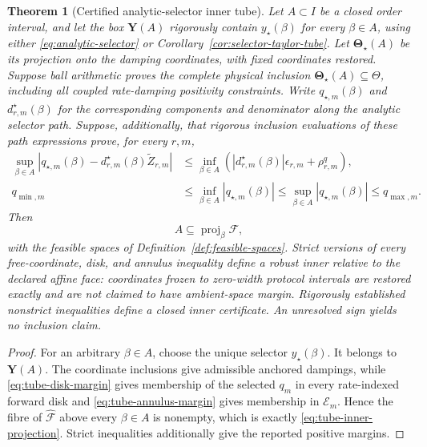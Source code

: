 \documentclass[11pt]{article}
\newtheorem{theorem}{Theorem}
\theoremstyle{definition}
\theoremstyle{remark}
\newcommand{\Eset}{\mathcal E}
\newcommand{\proj}{\operatorname{proj}}
\begin{document}
\begin{theorem}[Certified analytic-selector inner tube]
\label{thm:selector-tube}
Let \(A\subset I\) be a closed order interval, and let the box
\(\boldsymbol Y(A)\) rigorously contain \(y_\star(\beta)\) for every
\(\beta\in A\), using either \eqref{eq:analytic-selector} or
Corollary~\ref{cor:selector-taylor-tube}.  Let
\(\boldsymbol\Theta_\star(A)\) be its projection onto the damping coordinates,
with fixed coordinates restored.  Suppose ball arithmetic proves the complete
physical inclusion
\(\boldsymbol\Theta_\star(A)\subseteq\Theta\), including all coupled
rate-damping positivity constraints.  Write
\(q_{\star,m}(\beta)\) and \(d^\star_{r,m}(\beta)\) for the corresponding
components and denominator along the analytic selector path.  Suppose,
additionally, that rigorous inclusion evaluations of these path expressions
prove, for every \(r,m\),
\begin{align}
 \sup_{\beta\in A}
 |q_{\star,m}(\beta)-d^\star_{r,m}(\beta)\widetilde Z_{r,m}|
 &\le
 \inf_{\beta\in A}
 (|d^\star_{r,m}(\beta)|\epsilon_{r,m}+\rho^q_{r,m}),
 \label{eq:tube-disk-margin}\\
 q_{\min,m}
 &\le\inf_{\beta\in A}|q_{\star,m}(\beta)|
 \le\sup_{\beta\in A}|q_{\star,m}(\beta)|
 \le q_{\max,m}.
 \label{eq:tube-annulus-margin}
\end{align}
Then
\begin{equation}
 \boxed{A\subseteq\proj_\beta\mathcal F},
 \label{eq:tube-inner-projection}
\end{equation}
with the feasible spaces of Definition~\ref{def:feasible-spaces}.  Strict
versions of every free-coordinate, disk, and annulus inequality define a
\emph{robust inner relative to the declared affine face}: coordinates frozen
to zero-width protocol intervals are restored exactly and are not claimed to
have ambient-space margin.  Rigorously established nonstrict inequalities
define a \emph{closed inner} certificate.  An unresolved sign yields no
inclusion claim.
\end{theorem}
\begin{proof}
For an arbitrary \(\beta\in A\), choose the unique selector
\(y_\star(\beta)\).  It belongs to \(\boldsymbol Y(A)\).  The coordinate
inclusions give admissible anchored dampings, while
\eqref{eq:tube-disk-margin} gives membership of the selected \(q_m\) in every
rate-indexed forward disk and \eqref{eq:tube-annulus-margin} gives membership
in \(\Eset_m\).  Hence the fibre of \(\widehat{\mathcal F}\) above every
\(\beta\in A\) is nonempty, which is exactly
\eqref{eq:tube-inner-projection}.  Strict inequalities additionally give the
reported positive margins.
\end{proof}
\end{document}
